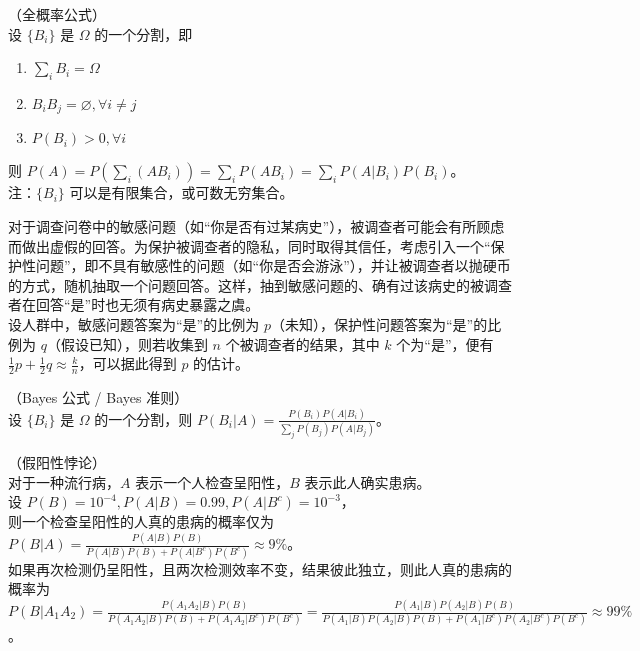 \documentclass[../main.tex]{subfiles}
\begin{document}
\begin{theorem}\label{thm:1.8.1}
    （全概率公式）\\
    设 $\{B_i\}$ 是 $\Omega$ 的一个分割，即
    \begin{enumerate}
        \item $\sum_iB_i=\Omega$
        \item $B_iB_j=\varnothing,\forall i\neq j$
        \item $P(B_i)>0,\forall i$
    \end{enumerate}
    则 $P(A)=P(\sum_{i}(AB_i))=\sum_iP(AB_i)=\sum_iP(A|B_i)P(B_i)$。\\
    注：$\{B_i\}$ 可以是有限集合，或可数无穷集合。
\end{theorem}

\begin{example}
    对于调查问卷中的敏感问题（如“你是否有过某病史”），被调查者可能会有所顾虑而做出虚假的回答。为保护被调查者的隐私，同时取得其信任，考虑引入一个“保护性问题”，即不具有敏感性的问题（如“你是否会游泳”），并让被调查者以抛硬币的方式，随机抽取一个问题回答。这样，抽到敏感问题的、确有过该病史的被调查者在回答“是”时也无须有病史暴露之虞。\\
    设人群中，敏感问题答案为“是”的比例为 $p$（未知），保护性问题答案为“是”的比例为 $q$（假设已知），则若收集到 $n$ 个被调查者的结果，其中 $k$ 个为“是”，便有 $\frac{1}{2}p+\frac{1}{2}q\approx \frac{k}{n}$，可以据此得到 $p$ 的估计。
\end{example}

\begin{theorem}\label{thm:1.8.2}
    （Bayes 公式 / Bayes 准则）\\
    设 $\{B_i\}$ 是 $\Omega$ 的一个分割，则 $P(B_i|A)=\frac{P(B_i)P(A|B_i)}{\sum_j P(B_j)P(A|B_j)}$。
\end{theorem}

\begin{example}
    （假阳性悖论）\\
    对于一种流行病，$A$ 表示一个人检查呈阳性，$B$ 表示此人确实患病。\\
    设 $P(B)=10^{-4},P(A|B)=0.99,P(A|B^c)=10^{-3}$，\\
    则一个检查呈阳性的人真的患病的概率仅为 $P(B|A)=\frac{P(A|B)P(B)}{P(A|B)P(B)+P(A|B^c)P(B^c)}\approx 9\%$。\\
    如果再次检测仍呈阳性，且两次检测效率不变，结果彼此独立，则此人真的患病的概率为 $P(B|A_1A_2)=\frac{P(A_1A_2|B)P(B)}{P(A_1A_2|B)P(B)+P(A_1A_2|B^c)P(B^c)}=\frac{P(A_1|B)P(A_2|B)P(B)}{P(A_1|B)P(A_2|B)P(B)+P(A_1|B^c)P(A_2|B^c)P(B^c)}\approx 99\%$。
\end{example}
\end{document}
